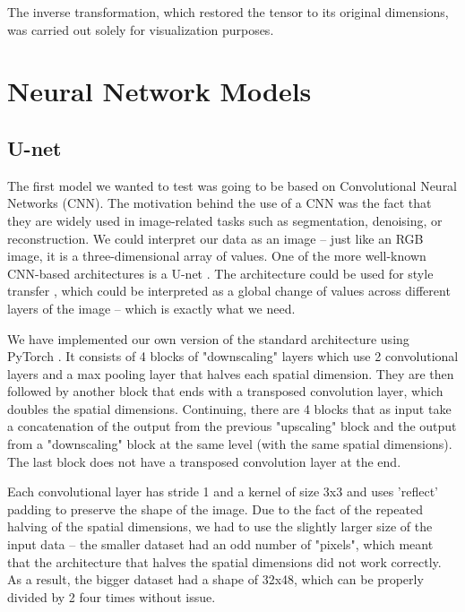 The inverse transformation, which restored the tensor to its original dimensions, was carried out solely for visualization purposes.

\section{Neural Network Models} \label{NN-theory}
\subsection{U-net}\label{chap:unet}

The first model we wanted to test was going to be based on Convolutional Neural Networks (CNN). The motivation behind the use of a CNN was the fact that they are widely used in image-related tasks such as segmentation, denoising, or reconstruction. We could interpret our data as an image -- just like an RGB image, it is a three-dimensional array of values. One of the more well-known CNN-based architectures is a U-net \cite{ronneberger2015unet}. The architecture could be used for style transfer \cite{Rao_2021}, which could be interpreted as a global change of values across different layers of the image -- which is exactly what we need.

We have implemented our own version of the standard architecture using PyTorch \cite{paszke2019pytorch}. It consists of 4 blocks of "downscaling" layers which use 2 convolutional layers and a max pooling layer that halves each spatial dimension. They are then followed by another block that ends with a transposed convolution layer, which doubles the spatial dimensions. Continuing, there are 4 blocks that as input take a concatenation of the output from the previous "upscaling" block and the output from a "downscaling" block at the same level (with the same spatial dimensions). The last block does not have a transposed convolution layer at the end.

Each convolutional layer has stride 1 and a kernel of size 3x3 and uses 'reflect' padding to preserve the shape of the image. Due to the fact of the repeated halving of the spatial dimensions, we had to use the slightly larger size of the input data -- the smaller dataset had an odd number of "pixels", which meant that the architecture that halves the spatial dimensions did not work correctly. As a result, the bigger dataset had a shape of 32x48, which can be properly divided by 2 four times without issue.


